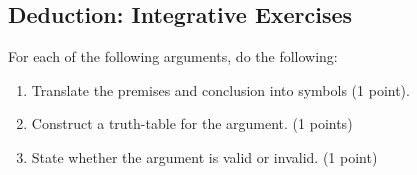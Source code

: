 \documentclass{exam}
\begin{document}
\begin{questions}

\section{Deduction: Integrative Exercises}

\question For each of the following arguments, do the following:  
\begin{enumerate}
\item Translate the premises and conclusion into symbols (1 point). 
\item Construct a truth-table for the argument. (1 points)
\item State whether the argument is valid or invalid. (1 point)
\end{enumerate} 


\end{questions}
\end{document}
